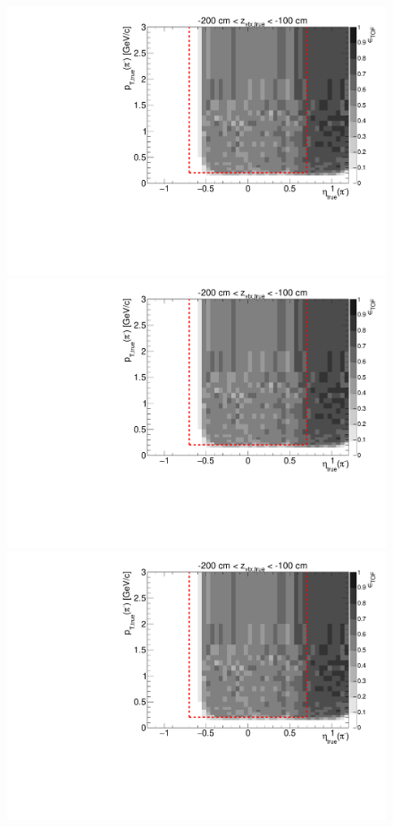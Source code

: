 \begin{figure}[hb]\ContinuedFloat
\centering
\parbox{0.495\textwidth}{
  \centering
  \includegraphics[width=\linewidth,page=11]{graphics/eff/Eff2D_TOF_pion_Minus.pdf}\\
  \includegraphics[width=\linewidth,page=13]{graphics/eff/Eff2D_TOF_pion_Minus.pdf}\\
  \includegraphics[width=\linewidth,page=15]{graphics/eff/Eff2D_TOF_pion_Minus.pdf}\\
}
\end{figure}
